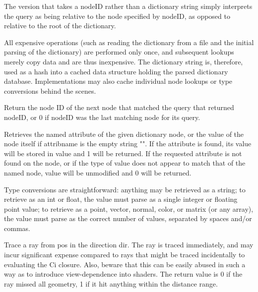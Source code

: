 \documentclass[11pt,letterpaper]{book}
\begin{document}
    The version that takes a nodeID rather than a dictionary string
    simply interprets the query as being relative to the node
    specified by nodeID, as opposed to relative to the root of the
    dictionary.

    All expensive operations (such as reading the dictionary from a file
    and the initial parsing of the dictionary) are performed only once,
    and subsequent lookups merely copy data and are thus inexpensive.
    The {\cf dictionary} string is, therefore, used as a hash into a
    cached data structure holding the parsed dictionary database.
    Implementations may also cache individual node lookups or type
    conversions behind the scenes.
\apiend

    Return the node ID of the next node that matched the query that
    returned nodeID, or 0 if nodeID was the last matching node for its
    query.
\apiend


    Retrieves the named attribute of the given dictionary node, or the
    value of the node itself if {\cf attribname} is the empty string
    {\cf ""}.  If the attribute is found, its value will be stored in
    {\cf value} and 1 will be returned.  If the requested attribute is
    not found on the node, or if the type of {\cf value} does not appear
    to match that of the named node, {\cf value} will be unmodified and
    0 will be returned.

    Type conversions are straightforward: anything may be retrieved as a
    string; to retrieve as an int or float, the value must parse as a
    single integer or floating point value; to retrieve as a point,
    vector, normal, color, or matrix (or any array), the value must
    parse as the correct number of values, separated by spaces and/or
    commas.
\apiend



Trace a ray from pos in the direction dir.  The ray is traced
immediately, and may incur significant expense compared to rays that
might be traced incidentally to evaluating the Ci closure.  Also, beware
that this can be easily abused in such a way as to introduce
view-dependence into shaders.
The return value is 0 if the ray missed all geometry, 1 if it hit
anything within the distance range.
\end{document}
